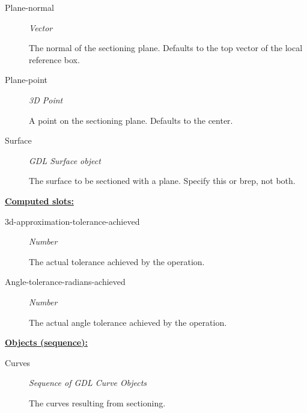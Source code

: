 \documentclass [11pt]{book}
\begin{document}
\begin{itemize}
\begin{description}
\item [Plane-normal]
\emph{Vector}

 The normal of the sectioning plane. Defaults to the top vector of the local reference box.




\item [Plane-point]
\emph{3D Point}

 A point on the sectioning plane. Defaults to the center.




\item [Surface]
\emph{GDL Surface object}

 The surface to be sectioned with a plane. Specify this or brep, not both.




\end{description}






\textbf{
\underline{Computed slots:}}

\begin{description}

\item [3d-approximation-tolerance-achieved]
\emph{Number}

 The actual tolerance achieved by the operation.




\item [Angle-tolerance-radians-achieved]
\emph{Number}

 The actual angle tolerance achieved by the operation.




\end{description}






\textbf{
\underline{Objects (sequence):}}

\begin{description}

\item [Curves]
\emph{Sequence of GDL Curve Objects}

 The curves resulting from sectioning.





\end{description}
\end{itemize}
\end{document}
